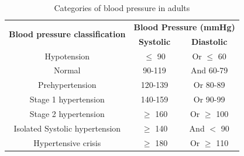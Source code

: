 \begin{table}[H]
    \centering
    \caption{Categories of blood pressure in adults \cite{Wang2018} \cite{Simjanoska20181}}
\begin{tabular}{|c|cc|}
\hline
\multirow{2}{*}{\textbf{Blood pressure classification}} & \multicolumn{2}{c|}{\textbf{Blood Pressure (mmHg)}} \\
 & \textbf{Systolic} & \textbf{Diastolic} \\ \hline
Hypotension & $\le$ 90 & Or $\le$ 60 \\
Normal & 90-119 & And 60-79 \\
Prehypertension & 120-139 & Or 80-89 \\
Stage 1 hypertension & 140-159 & Or 90-99 \\
Stage 2 hypertension & $\ge$ 160 & Or $\ge$ 100 \\ 
Isolated Systolic hypertension & $\ge$ 140 & And $<$ 90\\
Hypertensive crisis & $\ge$ 180 & Or $\ge$ 110 \\ \hline
\end{tabular}
\label{bp_vals_table}
\end{table}


